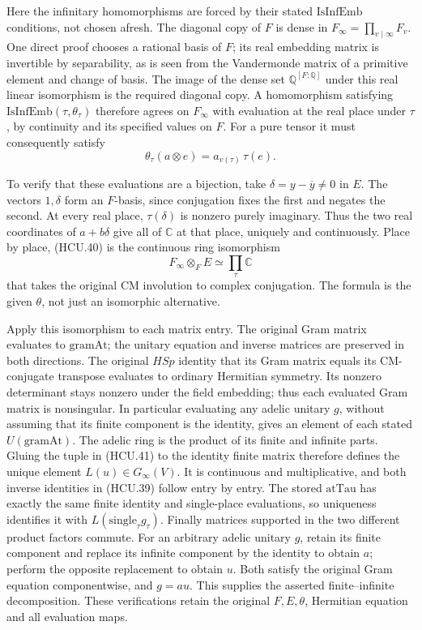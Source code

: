 Here the infinitary homomorphisms are forced by their stated
\(\mathrm{IsInfEmb}\) conditions, not chosen afresh.
The diagonal copy of \(F\) is dense in \(F_\infty=\prod_{v\mid\infty}F_v\).
One direct proof chooses a rational basis of \(F\); its real embedding
matrix is invertible by separability, as is seen from the Vandermonde
matrix of a primitive element and change of basis.
The image of the dense set \(\mathbb Q^{[F:\mathbb Q]}\) under this
real linear isomorphism is the required diagonal copy.
A homomorphism satisfying \(\mathrm{IsInfEmb}(\tau,\theta_\tau)\)
therefore agrees on \(F_\infty\) with evaluation at the real place
under \(\tau\), by continuity and its specified values on \(F\).
For a pure tensor it must consequently satisfy
\[
 \theta_\tau(a\otimes e)=a_{v(\tau)}\,\tau(e).
 \tag{HCU.40}
\]

To verify that these evaluations are a bijection, take
\(\delta=y-\overline y\ne0\) in \(E\).
The vectors \(1,\delta\) form an \(F\)-basis, since conjugation fixes
the first and negates the second.  At every real place,
\(\tau(\delta)\) is nonzero purely imaginary.
Thus the two real coordinates of \(a+b\delta\) give all of
\(\mathbb C\) at that place, uniquely and continuously.
Place by place, (HCU.40) is the continuous ring isomorphism
\[
 F_\infty\otimes_F E\simeq\prod_\tau\mathbb C
 \tag{HCU.41}
\]
that takes the original CM involution to complex conjugation.
The formula is the given \(\theta\), not just an isomorphic alternative.

Apply this isomorphism to each matrix entry.  The original Gram matrix
evaluates to \(\mathrm{gramAt}\); the unitary equation and inverse
matrices are preserved in both directions.
The original \(HSp\) identity that its Gram matrix equals its
CM-conjugate transpose evaluates to ordinary Hermitian symmetry.
Its nonzero determinant stays nonzero under the field embedding;
thus each evaluated Gram matrix is nonsingular.
In particular evaluating any adelic unitary \(g\), without assuming
that its finite component is the identity, gives an element of
each stated \(U(\mathrm{gramAt})\).
The adelic ring is the product of its finite and infinite parts.
Gluing the tuple in (HCU.41) to the identity finite matrix therefore
defines the unique element \(L(u)\in G_\infty(V)\).
It is continuous and multiplicative, and both inverse identities in
(HCU.39) follow entry by entry.
The stored \(\mathrm{atTau}\) has exactly the same finite identity
and single-place evaluations, so uniqueness identifies it with
\(L(\mathrm{single}_\tau g_\tau)\).
Finally matrices supported in the two different product factors
commute.  For an arbitrary adelic unitary \(g\), retain its finite
component and replace its infinite component by the identity to
obtain \(a\); perform the opposite replacement to obtain \(u\).
Both satisfy the original Gram equation componentwise, and \(g=au\).
This supplies the asserted finite--infinite decomposition.
These verifications retain the original \(F,E,\theta\),
Hermitian equation and all evaluation maps.

